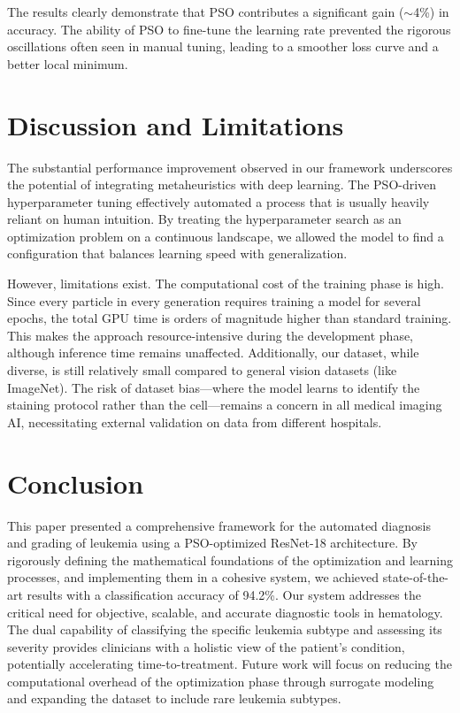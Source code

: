 \documentclass[journal]{IEEEtran}
\begin{document}
The results clearly demonstrate that PSO contributes a significant gain ($\sim$4\%) in accuracy. The ability of PSO to fine-tune the learning rate prevented the rigorous oscillations often seen in manual tuning, leading to a smoother loss curve and a better local minimum.

\section{Discussion and Limitations}

The substantial performance improvement observed in our framework underscores the potential of integrating metaheuristics with deep learning. The PSO-driven hyperparameter tuning effectively automated a process that is usually heavily reliant on human intuition. By treating the hyperparameter search as an optimization problem on a continuous landscape, we allowed the model to find a configuration that balances learning speed with generalization.

However, limitations exist. The computational cost of the training phase is high. Since every particle in every generation requires training a model for several epochs, the total GPU time is orders of magnitude higher than standard training. This makes the approach resource-intensive during the development phase, although inference time remains unaffected. Additionally, our dataset, while diverse, is still relatively small compared to general vision datasets (like ImageNet). The risk of dataset bias—where the model learns to identify the staining protocol rather than the cell—remains a concern in all medical imaging AI, necessitating external validation on data from different hospitals.

\section{Conclusion}

This paper presented a comprehensive framework for the automated diagnosis and grading of leukemia using a PSO-optimized ResNet-18 architecture. By rigorously defining the mathematical foundations of the optimization and learning processes, and implementing them in a cohesive system, we achieved state-of-the-art results with a classification accuracy of 94.2\%. Our system addresses the critical need for objective, scalable, and accurate diagnostic tools in hematology. The dual capability of classifying the specific leukemia subtype and assessing its severity provides clinicians with a holistic view of the patient's condition, potentially accelerating time-to-treatment. Future work will focus on reducing the computational overhead of the optimization phase through surrogate modeling and expanding the dataset to include rare leukemia subtypes.
\end{document}
